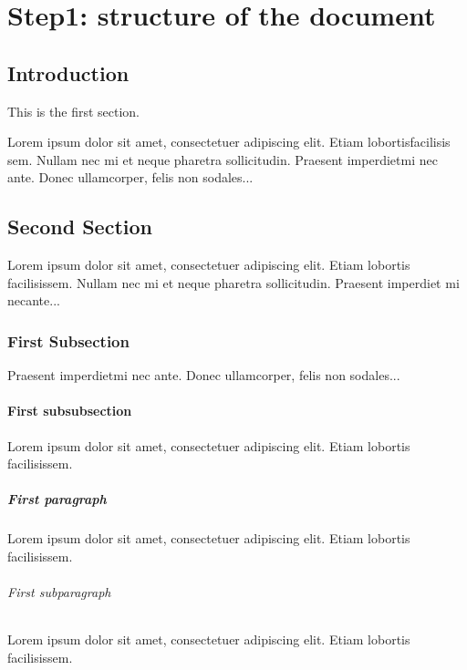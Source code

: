 



\chapter{Step1: structure of the document}

\section{Introduction}

This is the first section.

Lorem  ipsum  dolor  sit  amet,  consectetuer  adipiscing  
elit. Etiam  lobortisfacilisis sem.  Nullam nec mi et 
neque pharetra sollicitudin.  Praesent imperdietmi nec ante. 
Donec ullamcorper, felis non sodales...

\section{Second Section}

Lorem ipsum dolor sit amet, consectetuer adipiscing elit.  
Etiam lobortis facilisissem.  Nullam nec mi et neque pharetra 
sollicitudin.  Praesent imperdiet mi necante...

\subsection{First Subsection}
Praesent imperdietmi nec ante. Donec ullamcorper, felis non sodales...

\subsubsection{First subsubsection}
Lorem ipsum dolor sit amet, consectetuer adipiscing elit.  
Etiam lobortis facilisissem.
\paragraph{First paragraph}
Lorem ipsum dolor sit amet, consectetuer adipiscing elit.  
Etiam lobortis facilisissem.
\subparagraph{First subparagraph}
Lorem ipsum dolor sit amet, consectetuer adipiscing elit.  
Etiam lobortis facilisissem.

